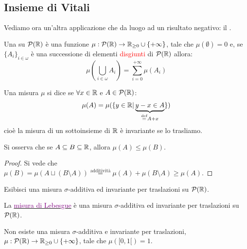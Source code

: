 \subsection{Insieme di Vitali}

Vediamo ora un'altra applicazione che da luogo ad un risultato negativo: il .

\begin{definition}
	Una  su $\mathcal{P}(\mathbb R)$ è una funzione $\mu : \mathcal{P}(\mathbb R) \rightarrow \mathbb R_{\geq 0}\cup\{+\infty\}$, tale che $\mu(\emptyset) = 0$ e, se $\{A_i\}_{i \in \omega}$ è 
	una successione di elementi \textcolor{red}{disgiunti} di $\mathcal{P}(\mathbb R)$ allora:
	\[ \mu\left(\bigcup_{i \in\omega} A_i\right) = \sum_{i = 0}^{+\infty} \mu(A_i)
		\]
\end{definition}

\begin{definition}
	Una misura $\mu$ si dice  se $\forall x \in \mathbb R$ e $A \in \mathcal{P}(\mathbb R)$:
	\[ \mu(A) = \mu(\{y \in \mathbb R | \underbrace{y - x \in A}_{\overset{\text{def}}{=} A + x}\})
		\]
	cioè la misura di un sottoinsieme di $\mathbb R$ è invariante se lo trasliamo.
\end{definition}

\begin{remark}
	Si osserva che se $A \subseteq B \subseteq \mathbb R$, allora $\mu(A) \leq \mu(B)$.
\end{remark}

\begin{proof}
	Si vede che $\mu(B) = \mu(A \sqcup (B \setminus A)) \overset{\text{additività}}{=} \mu(A) + \mu(B \setminus A) \geq \mu(A)$.
\end{proof}

\begin{exercise}
	Esibisci una misura $\sigma$-additiva ed invariante per traslazioni su $\mathcal{P}(\mathbb R)$.
\end{exercise}

\begin{soln}
	La \href{https://en.wikipedia.org/wiki/Lebesgue_measure}{\textcolor{purple}{misura di Lebesgue}} è una misura $\sigma$-additiva ed invariante per traslazioni su $\mathcal{P}(\mathbb R)$.
\end{soln}

\begin{proposition}
	Non esiste una misura $\sigma$-additiva e invariante per traslazioni, $\mu : \mathcal{P}(\mathbb R) \to \mathbb R_{\geq 0} \cup \{+\infty\}$, tale che $\mu([0,1[) = 1$.
\end{proposition}

